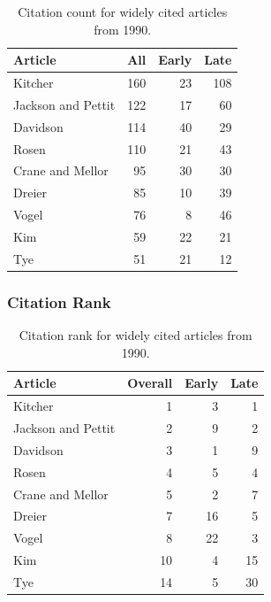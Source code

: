\documentclass[
  10pt,
  letterpaper,
  DIV=11,
  numbers=noendperiod,
  twoside]{scrartcl}
\begin{document}
\begin{longtable}[]{@{}lrrr@{}}

\caption{\label{tbl-citation-count-1990}Citation count for widely cited
articles from 1990.}

\tabularnewline

\toprule\noalign{}
Article & All & Early & Late \\
\midrule\noalign{}
\endhead
\bottomrule\noalign{}
\endlastfoot
Kitcher & 160 & 23 & 108 \\
Jackson and Pettit & 122 & 17 & 60 \\
Davidson & 114 & 40 & 29 \\
Rosen & 110 & 21 & 43 \\
Crane and Mellor & 95 & 30 & 30 \\
Dreier & 85 & 10 & 39 \\
Vogel & 76 & 8 & 46 \\
Kim & 59 & 22 & 21 \\
Tye & 51 & 21 & 12 \\

\end{longtable}

\subsubsection*{Citation Rank}\label{sec-rank-1990}

\begin{longtable}[]{@{}lrrr@{}}

\caption{\label{tbl-citation-rank-1990}Citation rank for widely cited
articles from 1990.}

\tabularnewline

\toprule\noalign{}
Article & Overall & Early & Late \\
\midrule\noalign{}
\endhead
\bottomrule\noalign{}
\endlastfoot
Kitcher & 1 & 3 & 1 \\
Jackson and Pettit & 2 & 9 & 2 \\
Davidson & 3 & 1 & 9 \\
Rosen & 4 & 5 & 4 \\
Crane and Mellor & 5 & 2 & 7 \\
Dreier & 7 & 16 & 5 \\
Vogel & 8 & 22 & 3 \\
Kim & 10 & 4 & 15 \\
Tye & 14 & 5 & 30 \\

\end{longtable}
\end{document}
